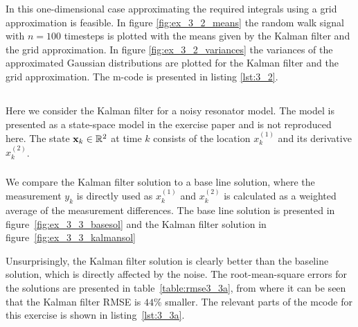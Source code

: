 \documentclass[a4paper,oneside,article]{memoir}
\begin{document}
In this one-dimensional case approximating the required
integrals using a grid approximation is feasible. In figure \ref{fig:ex_3_2_means}
the random walk signal with $n=100$ timesteps is plotted with the means given
by the Kalman filter and the grid approximation. In figure \ref{fig:ex_3_2_variances}
the variances of the approximated Gaussian distributions are plotted for 
the Kalman filter and the grid approximation. The m-code is presented in listing \ref{lst:3_2}. 

\clearpage


\subsection{}\label{sec:3_3}
Here we consider the Kalman filter for a noisy resonator model. The model
is presented as a state-space model in the exercise paper and is not
reproduced here. The state $\mathbf{x}_k\in\mathbb{R}^2$ at time $k$ consists
of the location $x_k^{(1)}$ and its derivative $x_k^{(2)}$. 

\subsubsection{}\label{sec:3_3a}
We compare the Kalman filter solution to a base line solution, where the
measurement $y_k$ is directly used as $x_k^{(1)}$ and $x_k^{(2)}$ is calculated
as a weighted average of the measurement differences. The base line solution is
presented in figure~\ref{fig:ex_3_3_basesol} and the Kalman filter solution in 
figure~\ref{fig:ex_3_3_kalmansol}


Unsurprisingly, the Kalman filter solution is clearly better than the baseline
solution, which is directly affected by the noise. The root-mean-square errors
for the solutions are presented in table~\ref{table:rmse3_3a}, from where
it can be seen that the Kalman filter RMSE is $44$\% smaller. The relevant
parts of the mcode for this exercise is shown in listing~\ref{lst:3_3a}.
\end{document}
